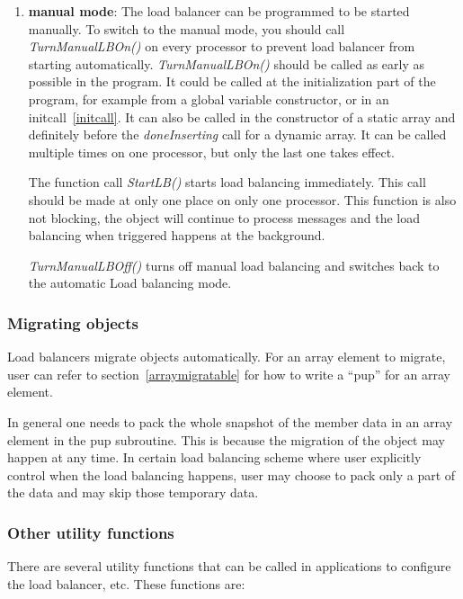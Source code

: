 \begin{enumerate}
\item {\bf manual mode}: The load balancer can be programmed to be started
manually. To switch to the manual mode, you should call
{\em TurnManualLBOn()} on every processor to prevent load balancer from 
starting automatically. {\em TurnManualLBOn()} should be called as 
early as possible in the program. It could be called at the initialization 
part of the program, 
for example from a global variable constructor, or in an initcall~\ref{initcall}.
It can also be called in the constructor of a static array and
definitely before the {\em doneInserting} call for a dynamic array.  
It can be called multiple times on one 
processor, but only the last one takes effect.

The function call {\em StartLB()} starts load balancing immediately. 
This call should be made at only one place on only one processor.
This function is also not blocking, the object will continue to process
messages and the load balancing when triggered
happens at the background.

{\em TurnManualLBOff()} turns off manual load balancing and 
switches back to the automatic Load balancing mode.

\end{enumerate}

\subsubsection{Migrating objects}

\label{lbmigobj}

Load balancers migrate objects automatically.
For an array element to migrate, user can refer to section~\ref{arraymigratable}
for how to write a ``pup'' for an array element.

In general one needs to pack the whole snapshot of the member data in an 
array element in the pup subroutine. This is because the migration of
the object may happen at any time. In certain load balancing scheme where
user explicitly control when the load balancing happens, user may choose
to pack only a part of the data and may skip those temporary data.

\subsubsection{Other utility functions}

There are several utility functions that can be called in applications to
configure the load balancer, etc. These functions are:

